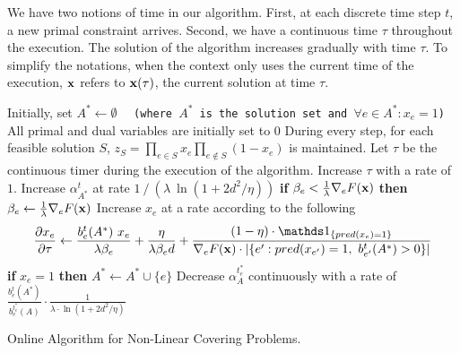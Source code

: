 We have two notions of time in our algorithm. First, at each discrete time step $t$, a new primal constraint arrives. Second, we have a continuous time $\tau$ throughout the execution. The solution of the algorithm increases gradually with time $\tau$.  To simplify the notations, when the context only uses the current time of the execution, $\mathbf{x}$ refers to $\mathbf{x}(\tau)$, the current solution at time $\tau$.

\begin{algorithm}[!ht]
	\begin{algorithmic}[1]
	\STATE Initially, set $A^* \gets \emptyset$ \ \ \texttt{(where $A^*$ is the solution set and $\forall e \in A^* : x_{e} = 1$)}
	\STATE All primal and dual variables are initially set to 0
	\STATE During every step, for each feasible solution $S$, $z_{S} = \prod_{e \in S} x_{e} \prod_{e \notin S} (1 - x_{e})$ is maintained.
	\STATE Let $\tau$ be the continuous timer during the execution of the algorithm.
			\STATE Increase $\tau$ with a rate of $1$.
			\STATE Increase $\alpha^{t}_{A^{*}}$ at rate $1\ /\ (\lambda \ \ln(1+2d^{2}/\eta))$
			\label{algo-covering:alpha}
				\STATE \textbf{if} $\beta_{e} <  \frac{1}{\lambda} \nabla_{e} F(\mathbf{x})$ \textbf{then}
				$\beta_{e} \gets \frac{1}{\lambda} \nabla_{e} F(\mathbf{x})$
				\label{algo-covering:beta}
				\STATE Increase $x_{e}$ at a rate according to the following
				\begin{align*}
					\frac{\partial x_{e}}{\partial \tau}	\gets
					\frac{b^{t}_{e}(A^{*}) \ x_{e}}{\lambda \beta_{e}} + \frac{\eta}{\lambda \beta_{e} d}
					+ \frac{(1 - \eta) \cdot \one_{\{pred(x_{e}) = 1\}}}{\nabla_{e} F(\vect{x}) \cdot |\{e': pred(x_{e'}) = 1,\ b^{t}_{e'}(A^{*}) > 0\}| }
				\end{align*}
				\label{algo-covering:x}
			\ENDFOR
			\STATE \textbf{if} $x_{e} = 1$ \textbf{then} $A^{*} \gets A^{*} \cup \{e\}$
			 \label{algo-decrease}
						 \label{algo-covering:bmax}
							\STATE Decrease $\alpha^{t_{e}^{*}}_{A}$ continuously with a rate of
							$\frac{b^{t}_{e}(A^{*})}{b^{t_{e}^{*}}_{e}(A)} \cdot\frac{1}{\lambda \cdot \ln(1+2d^{2}/\eta)}$
							\label{algo-covering:decrease}
					\ENDFOR
				\ENDWHILE
			\ENDFOR
		\ENDWHILE
	\ENDFOR
	\end{algorithmic}
	\caption{Online Algorithm for Non-Linear Covering Problems.}
	\label{algo:covering}
\end{algorithm}

